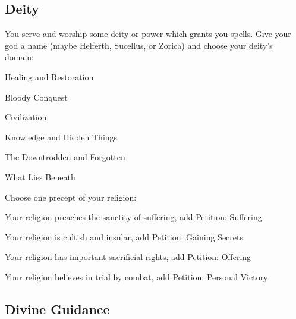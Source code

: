              
\subsection{Deity}   
             

You serve and worship some deity or power which grants you spells. Give your god a name (maybe Helferth, Sucellus, or Zorica) and choose your deity’s domain:

             
\startitemize[1,packed]
               
\item Healing and Restoration

               
\item Bloody Conquest

               
\item Civilization

               
\item Knowledge and Hidden Things

               
\item The Downtrodden and Forgotten

               
\item What Lies Beneath

             
\stopitemize
             

Choose one precept of your religion:

             
\startitemize[1,packed]
               
\item Your religion preaches the sanctity of suffering, add Petition: Suffering

               
\item Your religion is cultish and insular, add Petition: Gaining Secrets

               
\item Your religion has important sacrificial rights, add Petition: Offering

               
\item Your religion believes in trial by combat, add Petition: Personal Victory

             
\stopitemize
           

           

             
\subsection{Divine Guidance}    
             

